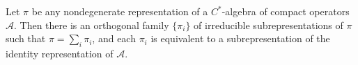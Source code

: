 Let $\pi$ be any nondegenerate representation of a $C^*$-algebra of compact operators $\mathcal{A}$. Then there is an orthogonal family $\{\pi_i\}$ of irreducible subrepresentations of $\pi$ such that $\pi = \sum_i \pi_i$, and each $\pi_i$ is equivalent to a subrepresentation of the identity representation of $\mathcal{A}$.
